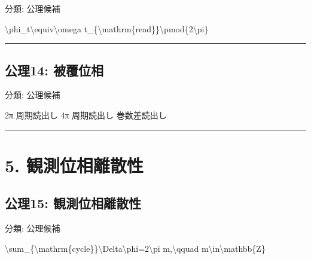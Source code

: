 \documentclass[
  a4paper,
]{ltjsarticle}
\newenvironment{Shaded}{}{}
\newcommand{\NormalTok}[1]{#1}
\begin{document}
分類: 公理候補

\begin{Shaded}
\begin{Highlighting}[]
\NormalTok{\textbackslash{}phi\_t\textbackslash{}equiv\textbackslash{}omega t\_\{\textbackslash{}mathrm\{read\}\}\textbackslash{}pmod\{2\textbackslash{}pi\}}
\end{Highlighting}
\end{Shaded}

\begin{center}\rule{0.5\linewidth}{0.5pt}\end{center}

\subsection{公理14:
被覆位相}\label{ux516cux740614-ux88abux8986ux4f4dux76f8}

分類: 公理候補

\begin{Shaded}
\begin{Highlighting}[]
\NormalTok{2π 周期読出し}
\NormalTok{4π 周期読出し}
\NormalTok{巻数差読出し}
\end{Highlighting}
\end{Shaded}

\begin{center}\rule{0.5\linewidth}{0.5pt}\end{center}

\section{5.
観測位相離散性}\label{ux89b3ux6e2cux4f4dux76f8ux96e2ux6563ux6027}

\subsection{公理15:
観測位相離散性}\label{ux516cux740615-ux89b3ux6e2cux4f4dux76f8ux96e2ux6563ux6027}

分類: 公理候補

\begin{Shaded}
\begin{Highlighting}[]
\NormalTok{\textbackslash{}sum\_\{\textbackslash{}mathrm\{cycle\}\}\textbackslash{}Delta\textbackslash{}phi=2\textbackslash{}pi m,\textbackslash{}qquad m\textbackslash{}in\textbackslash{}mathbb\{Z\}}
\end{Highlighting}
\end{Shaded}
\end{document}
